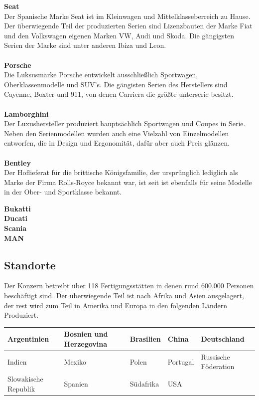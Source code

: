 \documentclass[12pt]{article}
\begin{document}
\newpage
\textbf{Seat}\\
Der Spanische Marke Seat ist im Kleinwagen und Mittelklasseberreich zu Hause. Der überwiegende Teil der produzierten Serien sind Lizenzbauten der Marke Fiat und den Volkswagen eigenen Marken VW, Audi und Skoda.
Die gängigsten Serien der Marke sind unter anderen Ibiza und Leon.\\
\\ 
\textbf{Porsche}\\
Die Luksusmarke Porsche entwickelt ausschließlich Sportwagen, Oberklassenmodelle und SUV's.
Die gängisten Serien des Herstellers sind Cayenne, Boxter und 911, von denen Carriera die größte unterserie besitzt.\\
\\
\textbf{Lamborghini}\\
Der Luxushersteller produziert hauptsächlich Sportwagen und Coupes in Serie. Neben den Serienmodellen wurden auch eine
Vielzahl von Einzelmodellen entworfen, die in Design und Ergonomität, dafür aber auch Preis glänzen.\\
\\
\textbf{Bentley}\\
Der Hoflieferat für die brittische Königsfamilie, der ursprünglich lediglich als Marke der Firma Rolls-Royce bekannt war, ist seit  ist ebenfalls für seine Modelle in der Ober- und Sportklasse bekannt.

\textbf{Bukatti}\\
\textbf{Ducati}\\
\textbf{Scania}\\
\textbf{MAN}


\newpage
\subsection{Standorte}
Der Konzern betreibt über 118 Fertigungsstätten in denen rund 600.000 Personen beschäftigt sind.
Der überwiegende Teil ist nach Afrika und Asien ausgelagert, der rest wird zum Teil in Amerika und Europa in den
folgenden Ländern Produziert. \cite{produktionsstandorte}
\begin{table}[h]
	\begin{tabular}{|l|l|l|l|l|}
		\hline
		Argentinien          & Bosnien und Herzegovina & Brasilien & China    & Deutschland          \\ \hline
		Indien               & Mexiko                  & Polen     & Portugal & Russische Föderation \\ \hline
		Slowakische Republik & Spanien                 & Südafrika & USA      &                      \\ \hline
	\end{tabular}
\end{table}
\\
\end{document}
